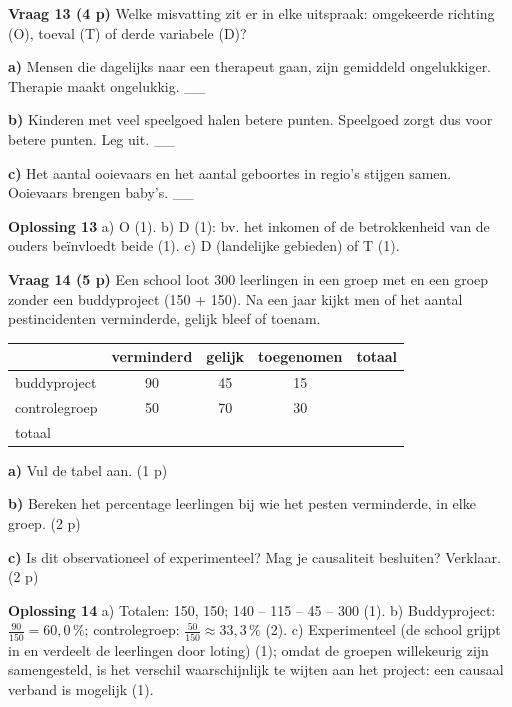 \textbf{Vraag 13 \quad (4 p)} Welke misvatting zit er in elke uitspraak: omgekeerde richting (O), toeval (T) of derde variabele (D)?

\textbf{a)} Mensen die dagelijks naar een therapeut gaan, zijn gemiddeld ongelukkiger. Therapie maakt ongelukkig. \_\_

\textbf{b)} Kinderen met veel speelgoed halen betere punten. Speelgoed zorgt dus voor betere punten. Leg uit. \_\_ \lijn

\textbf{c)} Het aantal ooievaars en het aantal geboortes in regio’s stijgen samen. Ooievaars brengen baby’s. \_\_

\begin{oplossing}
\textbf{Oplossing 13} \quad a) O (1). b) D (1): bv. het inkomen of de betrokkenheid van de ouders beïnvloedt beide (1). c) D (landelijke gebieden) of T (1).
\end{oplossing}

\textbf{Vraag 14 \quad (5 p)} Een school loot 300 leerlingen in een groep met en een groep zonder een buddyproject (150 + 150). Na een jaar kijkt men of het aantal pestincidenten verminderde, gelijk bleef of toenam.

\begin{tabular}{lcccc}
\hline
 & verminderd & gelijk & toegenomen & totaal \\
\hline
buddyproject & 90 & 45 & 15 & \\
controlegroep & 50 & 70 & 30 & \\
totaal & & & & \\
\hline
\end{tabular}

\textbf{a)} Vul de tabel aan. (1 p) \lijn

\textbf{b)} Bereken het percentage leerlingen bij wie het pesten verminderde, in elke groep. (2 p) \lijn

\textbf{c)} Is dit observationeel of experimenteel? Mag je causaliteit besluiten? Verklaar. (2 p) \lijn

\begin{oplossing}
\textbf{Oplossing 14} \quad a) Totalen: 150, 150; 140 – 115 – 45 – 300 (1). b) Buddyproject: $\frac{90}{150}=60{,}0\,\%$; controlegroep: $\frac{50}{150}\approx 33{,}3\,\%$ (2). c) Experimenteel (de school grijpt in en verdeelt de leerlingen door loting) (1); omdat de groepen willekeurig zijn samengesteld, is het verschil waarschijnlijk te wijten aan het project: een causaal verband is mogelijk (1).
\end{oplossing}

